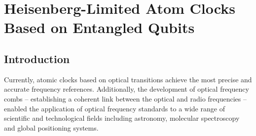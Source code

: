 \chapter{Heisenberg-Limited Atom Clocks Based on Entangled Qubits}
\label{ch:Kessler2014}

\section{Introduction}
Currently, atomic clocks based on optical transitions achieve the most
precise \cite{Nicholson2012, Bloom2013, Lemke2009} and accurate \cite{Chou2010,
Bloom2013} frequency references.
Additionally, the development of optical frequency combs
\cite{Eckstein1978, Reichert2000, Jones2000, Ye2003} -- establishing a coherent
link between the optical and radio frequencies -- enabled the application
of optical frequency standards to a wide range of scientific and technological
fields including astronomy, molecular spectroscopy and global
positioning systems.



